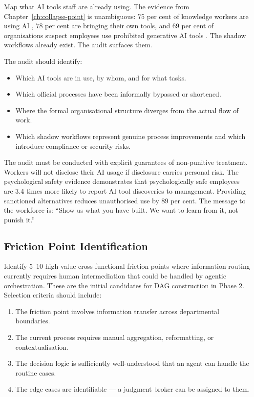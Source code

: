Map what AI tools staff are already using. The evidence from Chapter~\ref{ch:collapse-point} is unambiguous: 75 per cent of knowledge workers are using AI \parencite{MicrosoftWorkTrend2024}, 78 per cent are bringing their own tools, and 69 per cent of organisations suspect employees use prohibited generative AI tools \parencite{Gartner2025}. The shadow workflows already exist. The audit surfaces them.

The audit should identify:
\begin{itemize}
  \item Which AI tools are in use, by whom, and for what tasks.
  \item Which official processes have been informally bypassed or shortened.
  \item Where the formal organisational structure diverges from the actual flow of work.
  \item Which shadow workflows represent genuine process improvements and which introduce compliance or security risks.
\end{itemize}

The audit must be conducted with explicit guarantees of non-punitive treatment. Workers will not disclose their AI usage if disclosure carries personal risk. The psychological safety evidence \parencite{EdmondsonLei2025} demonstrates that psychologically safe employees are 3.4 times more likely to report AI tool discoveries to management. Providing sanctioned alternatives reduces unauthorised use by 89 per cent. The message to the workforce is: ``Show us what you have built. We want to learn from it, not punish it.''

\subsection{Friction Point Identification}

Identify 5--10 high-value cross-functional friction points where information routing currently requires human intermediation that could be handled by agentic orchestration. These are the initial candidates for DAG construction in Phase 2. Selection criteria should include:

\begin{enumerate}
  \item The friction point involves information transfer across departmental boundaries.
  \item The current process requires manual aggregation, reformatting, or contextualisation.
  \item The decision logic is sufficiently well-understood that an agent can handle the routine cases.
  \item The edge cases are identifiable --- a judgment broker can be assigned to them.
\end{enumerate}

